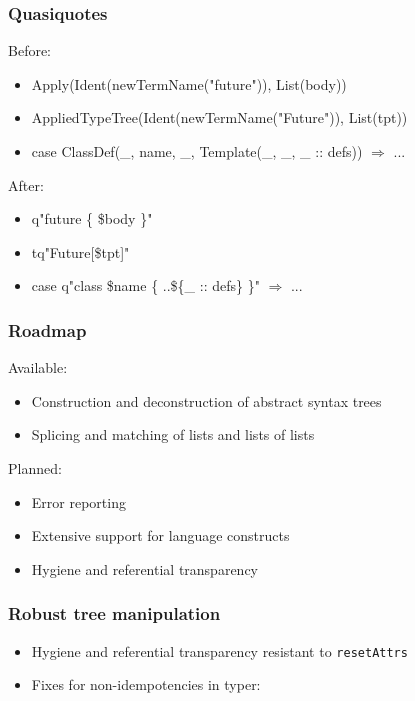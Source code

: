 \documentclass[svgnames,hyperref={bookmarks=false}]{beamer}
\begin{document}
\begin{frame}[fragile]
\frametitle{Quasiquotes}

Before:
\begin{itemize}
\item Apply(Ident(newTermName("future")), List(body))
\item AppliedTypeTree(Ident(newTermName("Future")), List(tpt))
\item case ClassDef(\_, name, \_, Template(\_, \_, \_ :: defs)) $\Rightarrow$ ...
\end{itemize}
\vskip25pt
After:
\begin{itemize}
\item q"future \{ \$body \}"
\item tq"Future[\$tpt]"
\item case q"class \$name \{ ..\$\{\_ :: defs\} \}" $\Rightarrow$ ...
\end{itemize}
\end{frame}

\begin{frame}[fragile]
\frametitle{Roadmap}

Available:
\begin{itemize}
\item Construction and deconstruction of abstract syntax trees
\item Splicing and matching of lists and lists of lists
\end{itemize}
\vskip25pt
Planned:
\begin{itemize}
\item Error reporting
\item Extensive support for language constructs
\item Hygiene and referential transparency
\end{itemize}
\end{frame}

\begin{frame}[fragile]
\frametitle{}

\vskip40pt
\begin{center}
\end{center}
\end{frame}

\begin{frame}[fragile]
\frametitle{Robust tree manipulation}

\begin{itemize}
\item Hygiene and referential transparency resistant to \texttt{resetAttrs}
\item Fixes for non-idempotencies in typer: 
\end{itemize}
\end{frame}
\end{document}
